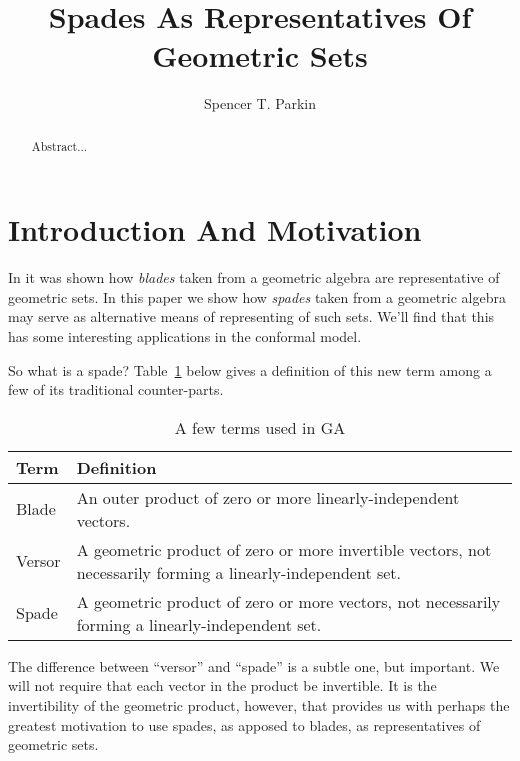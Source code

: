 \documentclass{birkjour}
\theoremstyle{definition}
\theoremstyle{remark}
\numberwithin{equation}{section}
\begin{document}
\title{Spades As Representatives Of Geometric Sets}

\author{Spencer T. Parkin}



\begin{abstract}
Abstract...
\end{abstract}


\maketitle

\section{Introduction And Motivation}

In \cite{Parkin15} it was shown how \emph{blades} taken from a geometric algebra are representative of geometric sets.
In this paper we show how \emph{spades} taken from a geometric algebra may serve as alternative means of representing of such sets.
We'll find that this has some interesting applications in the conformal model.

So what is a spade?  Table~\ref{tbl_terms} below gives a definition of this new term among a few of its traditional counter-parts.

\begin{table}[H]\label{tbl_terms}\caption{A few terms used in GA}
\begin{tabular}{p{1cm}p{9cm}}
Term & Definition \\
\hline
Blade & An outer product of zero or more linearly-independent vectors. \\
Versor & A geometric product of zero or more invertible vectors, not necessarily forming a linearly-independent set. \\
Spade & A geometric product of zero or more vectors, not necessarily forming a linearly-independent set.
\end{tabular}
\end{table}

The difference between ``versor'' and ``spade'' is a subtle one, but important.  We will not require that each vector
in the product be invertible.  It is the invertibility of the geometric product, however, that provides us with perhaps the
greatest motivation to use spades, as apposed to blades, as representatives of geometric sets.
\end{document}
